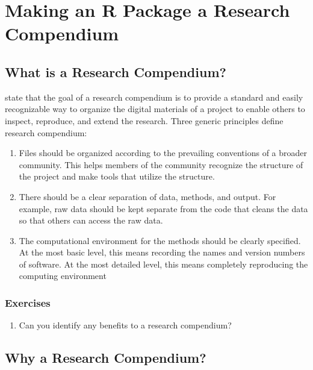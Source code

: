 \documentclass[
]{book}
\providecommand{\tightlist}{%
  \setlength{\itemsep}{0pt}\setlength{\parskip}{0pt}}
\begin{document}
\hypertarget{r-package-research-compendium}{%
\chapter{Making an R Package a Research Compendium}\label{r-package-research-compendium}}

\hypertarget{what-is-a-research-compendium}{%
\section{What is a Research Compendium?}\label{what-is-a-research-compendium}}

\citet{marwick2018packaging} state that the goal of a research compendium is to provide a standard and easily recognizable way to organize the digital materials of a project to enable others to inspect, reproduce, and extend the research. Three generic principles define research compendium:

\begin{enumerate}
\def\labelenumi{\arabic{enumi}.}
\item
  Files should be organized according to the prevailing conventions of a broader community. This helps members of the community recognize the structure of the project and make tools that utilize the structure.
\item
  There should be a clear separation of data, methods, and output. For example, raw data should be kept separate from the code that cleans the data so that others can access the raw data.
\item
  The computational environment for the methods should be clearly specified. At the most basic level, this means recording the names and version numbers of software. At the most detailed level, this means completely reproducing the computing environment
\end{enumerate}

\hypertarget{exercises-5}{%
\subsection{Exercises}\label{exercises-5}}

\begin{enumerate}
\def\labelenumi{\arabic{enumi}.}
\tightlist
\item
  Can you identify any benefits to a research compendium?
\end{enumerate}

\hypertarget{why-a-research-compendium}{%
\section{Why a Research Compendium?}\label{why-a-research-compendium}}
\end{document}
